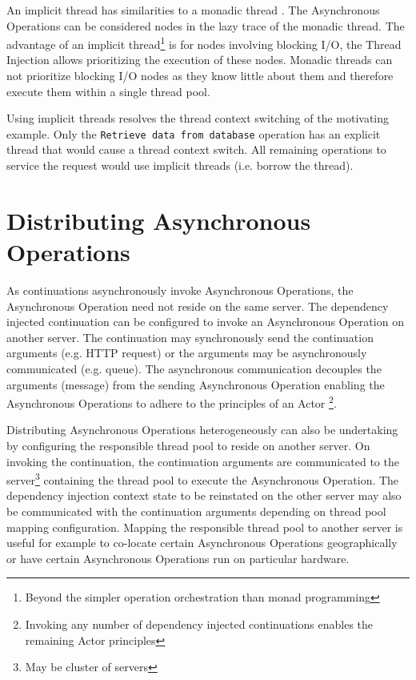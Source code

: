 \documentclass[prodmode]{style/acmlarge}
\begin{document}
An implicit thread has similarities to a monadic thread \cite{monadic-thread}.
The Asynchronous Operations can be considered nodes in the lazy trace of the
monadic thread.  The advantage of an implicit thread\footnote{Beyond the simpler
operation orchestration than monad programming} is for nodes involving blocking
I/O, the Thread Injection allows prioritizing the execution of these nodes. 
Monadic threads can not prioritize blocking I/O nodes as they know little about
them and therefore execute them within a single thread pool.

Using implicit threads resolves the thread context switching of the motivating
example.  Only the \texttt{Retrieve data from database} operation has an
explicit thread that would cause a thread context switch.  All remaining
operations to service the request would use implicit threads (i.e. borrow the
thread).


\section{Distributing Asynchronous Operations}

As continuations asynchronously invoke Asynchronous Operations, the Asynchronous
Operation need not reside on the same server.  The dependency injected
continuation can be configured to invoke an Asynchronous Operation on another
server.  The continuation may synchronously send the continuation arguments
(e.g. HTTP request) or the arguments may be asynchronously communicated (e.g.
queue).  The asynchronous communication decouples the arguments (message) from
the sending Asynchronous Operation enabling the Asynchronous Operations to
adhere to the principles of an Actor \cite{actors}\footnote{Invoking any number
of dependency injected continuations enables the remaining Actor principles}.

Distributing Asynchronous Operations heterogeneously can also be undertaking by
configuring the responsible thread pool to reside on another server.  On
invoking the continuation, the continuation arguments are communicated to the
server\footnote{May be cluster of servers} containing the thread pool to execute
the Asynchronous Operation.  The dependency injection context state to be
reinstated on the other server may also be communicated with the continuation
arguments depending on thread pool mapping configuration.  Mapping the
responsible thread pool to another server is useful for example to co-locate
certain Asynchronous Operations geographically or have certain Asynchronous
Operations run on particular hardware.
\end{document}
